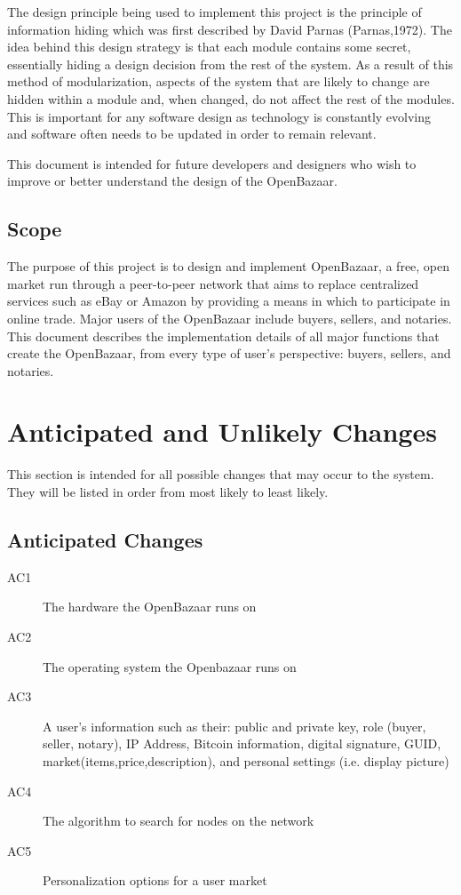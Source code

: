 \documentclass{article}
\begin{document}
The design principle being used to implement this project is the principle of information hiding which was first described by David Parnas (Parnas,1972). The idea behind this design strategy is that each module contains some secret, essentially hiding a design decision from the rest of the system. As a result of this method of modularization, aspects of the system that are likely to change are hidden within a module and, when changed, do not affect the rest of the modules. This is important for any software design as technology is constantly evolving and software often needs to be updated in order to remain relevant.

This document is intended for future developers and designers who wish to improve or better understand the design of the OpenBazaar.

\subsection{Scope}
The purpose of this project is to design and implement OpenBazaar, a free, open market run through a peer-to-peer network that aims to replace centralized services such as eBay or Amazon by providing a means in which to participate in online trade. Major users of the OpenBazaar include buyers, sellers, and notaries. This document describes the implementation details of all major functions that create the OpenBazaar, from every type of user's perspective: buyers, sellers, and notaries.


\section*{Anticipated and Unlikely Changes}
This section is intended for all possible changes that may occur to the system. They will be listed in order from most likely to least likely.
\newline
\newline
\subsection{Anticipated Changes}
\begin{description}
	\item[AC1]
	The hardware the OpenBazaar runs on
	\item[AC2]
	The operating system the Openbazaar runs on
	\item[AC3]
	A user's information such as their: public and private key, role (buyer, seller, notary), IP Address, Bitcoin information, digital signature, GUID, market(items,price,description), and personal settings (i.e. display picture)
	\item[AC4]
	The algorithm to search for nodes on the network
	\item[AC5]
	Personalization options for a user market
\end{description}
\end{document}
